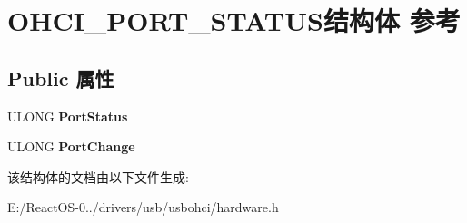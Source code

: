 \hypertarget{struct_o_h_c_i___p_o_r_t___s_t_a_t_u_s}{}\section{O\+H\+C\+I\+\_\+\+P\+O\+R\+T\+\_\+\+S\+T\+A\+T\+U\+S结构体 参考}
\label{struct_o_h_c_i___p_o_r_t___s_t_a_t_u_s}
\subsection*{Public 属性}
\begin{DoxyCompactItemize}
\item 
\mbox{\label{struct_o_h_c_i___p_o_r_t___s_t_a_t_u_s_a93bf4c28dfbb05c0692be800d8ec3157}} 
U\+L\+O\+NG {\bfseries Port\+Status}
\item 
\mbox{\label{struct_o_h_c_i___p_o_r_t___s_t_a_t_u_s_aedf45d133d9baa3dcba453983874c335}} 
U\+L\+O\+NG {\bfseries Port\+Change}
\end{DoxyCompactItemize}


该结构体的文档由以下文件生成\+:\begin{DoxyCompactItemize}
\item 
E\+:/\+React\+O\+S-\/0../drivers/usb/usbohci/hardware.\+h\end{DoxyCompactItemize}
